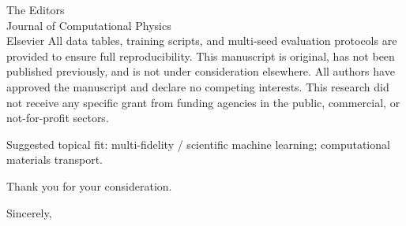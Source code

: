 \documentclass[11pt]{letter}
\begin{document}
\begin{letter}{The Editors\\Journal of Computational Physics\\Elsevier}
All data tables, training scripts, and multi-seed evaluation protocols are provided to ensure full reproducibility. This manuscript is original, has not been published previously, and is not under consideration elsewhere. All authors have approved the manuscript and declare no competing interests. This research did not receive any specific grant from funding agencies in the public, commercial, or not-for-profit sectors.

Suggested topical fit: multi-fidelity / scientific machine learning; computational materials transport.

Thank you for your consideration.

\closing{Sincerely,}

\end{letter}
\end{document}
